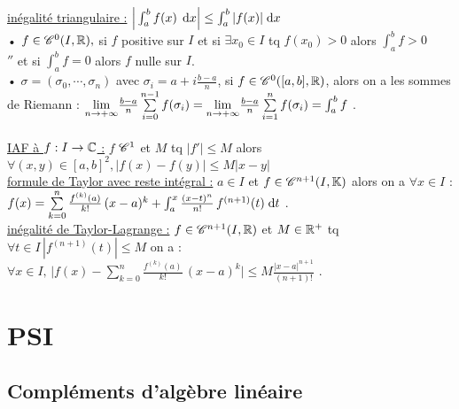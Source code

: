 \documentclass[12 pt]{exampleclass}
\begin{document}
\begin{flushleft}
\begin{doublespace}

	\underline{inégalité triangulaire :}  $\Big| \int_a^b f(x) \, \; \text{d}x \Big| \leq \int_a^b | f(x) | \; \text{d}x$\\
	• $f\in \mathscr{C}^0 (I,\mathbb{R}),$ si $f$ positive sur $I$ et si $\exists x_0\in I$ tq $f(x_0)>0$ alors $\int_a^b f >0$\\
	\qquad \quad $''$ \qquad et si $\int_a^b f = 0$ alors $f$ nulle sur $I$.\\
	
	• $\sigma = (\sigma_0,\cdots,\sigma_n)$ avec $\sigma_i = a + i\frac{b - a}{n}$, si $f\in \mathscr{C}^0([a,b],\mathbb{R})$, alors on a les sommes de Riemann : $\underset{n \rightarrow +\infty}{\text{lim}} \frac{b-a}{n} \sum\limits_{i = 0}^{n-1} f(\sigma_i) = \underset{n \rightarrow +			\infty}{\text{lim}} \frac{b-a}{n} \sum\limits_{i =1}^n f(\sigma_i) = \int_a^b f$ .\\
	
	\text{ }\\
	\underline{IAF à $f : I\rightarrow \mathbb{C}$ :} $f$ $\mathscr{C}^1$ et $M$ tq $|f'|\leq M$ alors $\forall (x,y)\in[a,b]^2, |f(x) - f(y)| \leq M |x - y|$\\
	\underline{formule de Taylor avec reste intégral :} $a\in I$ et $f\in \mathscr{C}^{n+1}(I,\mathbb{K})$ alors on a $\forall x\in I$ :\\
	$f(x) = \sum\limits_{k = 0}^n \frac{f^{(k)} (a)}{k!} \, (x-a)^k + \int_a^x \frac{(x-t)^n}{n!} \, f^{(n+1)} (t) \; \text{d}t$ .\\
	\underline{inégalité de Taylor-Lagrange :} $f\in\mathscr{C}^{n+1}(I,\mathbb{R})$ et $M\in\mathbb{R}^+$ tq $\forall t\in I \,|f^{(n+1)}(t) | \leq M$ on a :\\
	$\forall x\in I, \, \Big| f(x) - \sum\limits_{k=0}^n \frac{f^{(k)} (a)}{k!} \, (x-a)^k \Big| \leq M\frac{| x - a|^{n+1}}{(n+1)!}$ .\\

\end{doublespace}
\end{flushleft}

\chapter{PSI}

\section{Compléments d'algèbre linéaire}
\end{document}
